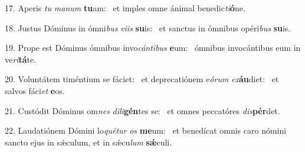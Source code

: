 17. Aperis \textit{tu} \textit{ma}\textit{num} \textbf{tu}am: \ast\  et imples omne ánimal benedic\textit{ti}\textbf{ó}ne.\

18. Justus Dóminus in ómni\textit{bus} \textit{vi}\textit{is} \textbf{su}is: \ast\  et sanctus in ómnibus opéri\textit{bus} \textbf{su}is.\

19. Prope est Dóminus ómnibus invo\textit{cán}\textit{ti}\textit{bus} \textbf{e}um: \ast\  ómnibus invocántibus eum in ve\textit{ri}\textbf{tá}te.\

20. Voluntátem timéntium se fáciet: \dag\  et deprecatiónem e\textit{ó}\textit{rum} \textit{ex}\textbf{áu}diet: \ast\  et salvos fáci\textit{et} \textbf{e}os.\

21. Custódit Dóminus om\textit{nes} \textit{di}\textit{li}\textbf{gén}tes se: \ast\  et omnes peccatóres \textit{dis}\textbf{pér}det.\

22. Laudatiónem Dómini lo\textit{qué}\textit{tur} \textit{os} \textbf{me}um: \ast\  et benedícat omnis caro nómini sancto ejus in sǽculum, et in sǽcu\textit{lum} \textbf{sǽ}culi.\

